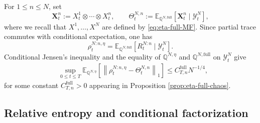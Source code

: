 \documentclass[10pt,a4paper,reqno]{amsart}
\numberwithin{equation}{section}
\theoremstyle{plain}
\theoremstyle{definition}
\theoremstyle{remark}
\newcommand{\E}{\mathbb E}
\newcommand{\Q}{\mathbb Q}
\newcommand{\cY}{\mathcal Y}
\newcommand{\1}{\mathbf 1}
\begin{document}
For \(1\le n\le N\), set
\begin{equation}
  \mathbf X_t^n
  :=
  X_t^1\otimes\cdots\otimes X_t^n,
  \qquad
  \Theta_t^{N,n}
  :=
  \E_{\Q^{N,\mathrm{full}}}
  \left[
    \mathbf X_t^n\mid\cY_t^N
  \right],
  \label{eq:eta-product-Theta-def}
\end{equation}
where we recall that \(X^1,\ldots,X^N\) are defined by 
  \eqref{eq:eta-full-MF}.  Since partial trace commutes with conditional expectation,  one has
\[
  \rho_t^{N:n,\eta}
  =
  \E_{\Q^{N,\mathrm{full}}}
  \left[
    R_t^{N:n}\mid\cY_t^N
  \right].
\]
Conditional Jensen's inequality and the equality of
\(\Q^{N,\eta}\) and \(\Q^{N,\mathrm{full}}\) on \(\cY_t^N\) give
\begin{equation}
\begin{aligned}
  &\sup_{0\le t\le T}
  \E_{\Q^{N,\eta}}
  \left[
    \left\|
      \rho_t^{N:n,\eta}-\Theta_t^{N,n}
    \right\|_1
  \right]
  \le
  C_{T,n}^{\mathrm{full}}N^{-1/4},
\end{aligned}
  \label{eq:eta-first-term-bound}
\end{equation}
for some constant $C_{T,n}^{\mathrm{full}}>0$ appearing in Proposition \ref{prop:eta-full-chaos}.


\subsection{Relative entropy and conditional factorization}
\label{subsec:eta-conditional-factorization}
\end{document}
